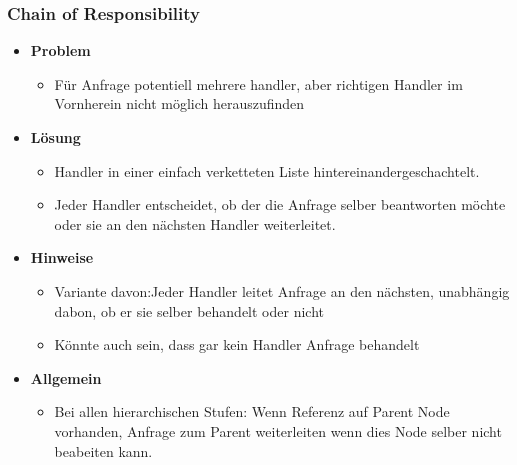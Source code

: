 \documentclass[../ZF_SWEN1.tex]{subfiles}
\begin{document}
\subsubsection{Chain of Responsibility}
\begin{itemize}
	\item \textbf{Problem}
	\begin{itemize}
		\item Für Anfrage potentiell mehrere handler, aber richtigen Handler im Vornherein nicht möglich herauszufinden
	\end{itemize}
	\item \textbf{Lösung}
	\begin{itemize}
		\item Handler in einer einfach verketteten Liste hintereinandergeschachtelt.
		\item Jeder Handler entscheidet, ob der die Anfrage selber beantworten möchte oder sie an den nächsten Handler weiterleitet.
	\end{itemize}
	\item \textbf{Hinweise}
	\begin{itemize}
		\item Variante davon:Jeder Handler leitet Anfrage an den nächsten, unabhängig dabon, ob er sie selber behandelt oder nicht
		\item Könnte auch sein, dass gar kein Handler Anfrage behandelt		
	\end{itemize}
	\item\textbf{ Allgemein}
	\begin{itemize}
		\item Bei allen hierarchischen Stufen: Wenn Referenz auf Parent Node vorhanden, Anfrage zum Parent weiterleiten wenn dies Node selber nicht beabeiten kann.
	\end{itemize}
\end{itemize}
\end{document}
